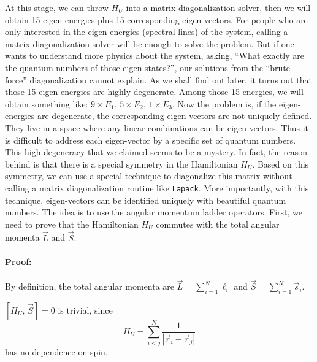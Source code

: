 At this stage, we can throw $H_U$ into a matrix diagonalization solver,
then we will obtain 15 eigen-energies plus 15 corresponding eigen-vectors.
For people who are only interested in the eigen-energies (spectral lines)
of the system, calling a matrix diagonalization solver will be enough
to solve the problem. But if one wants to understand more physics about the system,
asking, ``What exactly are the quantum numbers of those eigen-states?'', our solutions
from the ``brute-force'' diagonalization cannot explain. As we shall find out later,
it turns out that those 15 eigen-energies are highly
degenerate. Among those 15 energies, we will obtain something like:
$9\times E_1$, $5\times E_2$, $1\times E_3$.
Now the problem is, if the eigen-energies are degenerate, the corresponding
eigen-vectors are not uniquely defined. They live in a space where any
linear combinations can be eigen-vectors. Thus it is difficult to address
each eigen-vector by a specific set of quantum numbers.
This high degeneracy that we claimed seems to be a mystery.
In fact, the reason behind is that there is a special symmetry in the Hamiltonian $H_U$.
Based on this symmetry, we can use a special technique to diagonalize this matrix
without calling a matrix diagonalization routine like \texttt{Lapack}.
More importantly, with this technique, eigen-vectors can be identified uniquely with beautiful quantum numbers.
The idea is to use the angular momentum ladder operators. First, we need to prove that
the Hamiltonian $H_U$ commutes with the total angular momenta $\vec{L}$ and $\vec{S}$.

\paragraph{Proof:} By definition, the total angular momenta are
$\vec{L}=\sum_{i=1}^N\boldsymbol{\ell}_i$ and $\vec{S}=\sum_{i=1}^N\vec{s}_i$.

$[H_U,\,\vec{S}]=0$ is trivial, since
\begin{equation}
H_U = \sum_{i<j}^N \frac{1}{|\vec{r}_i - \vec{r}_j|}
\end{equation}
has no dependence on spin.

